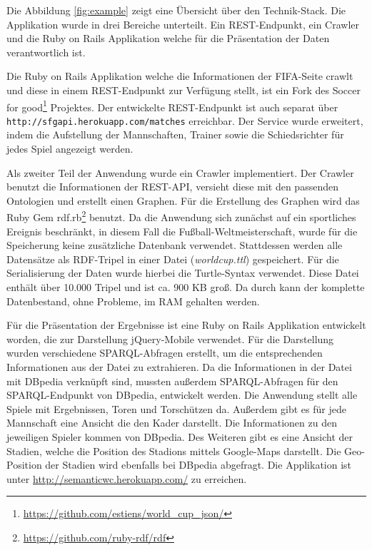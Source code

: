 \documentclass[runningheads,a4paper]{llncs}
\begin{document}
Die Abbildung \ref{fig:example} zeigt eine Übersicht über den Technik-Stack. Die Applikation wurde in drei Bereiche unterteilt. Ein REST-Endpunkt, ein Crawler und die Ruby on Rails Applikation welche für die Präsentation der Daten verantwortlich ist.

Die Ruby on Rails Applikation welche die Informationen der FIFA-Seite crawlt und diese in einem REST-Endpunkt zur Verfügung stellt, ist ein Fork des Soccer for good\footnote{\url{https://github.com/estiens/world_cup_json/}} Projektes. Der entwickelte REST-Endpunkt ist auch separat über \texttt{http://sfgapi.herokuapp.com/matches} erreichbar. Der Service wurde erweitert, indem die Aufstellung der Mannschaften, Trainer sowie die Schiedsrichter für jedes Spiel angezeigt werden. 

Als zweiter Teil der Anwendung wurde ein Crawler implementiert. Der Crawler benutzt die Informationen der REST-API, versieht diese mit den passenden Ontologien und erstellt einen Graphen. Für die Erstellung des Graphen wird das Ruby Gem rdf.rb\footnote{\url{https://github.com/ruby-rdf/rdf}} benutzt. Da die Anwendung sich zunächst auf ein sportliches Ereignis beschränkt, in diesem Fall die Fußball-Weltmeisterschaft, wurde für die Speicherung keine zusätzliche Datenbank verwendet. Stattdessen werden alle Datensätze als RDF-Tripel in einer Datei (\textit{worldcup.ttl}) gespeichert. Für die Serialisierung der Daten wurde hierbei die Turtle-Syntax verwendet. Diese Datei enthält über 10.000 Tripel und ist ca. 900 KB groß. Da durch kann der komplette Datenbestand, ohne Probleme, im RAM gehalten werden.

Für die Präsentation der Ergebnisse ist eine Ruby on Rails Applikation entwickelt worden, die zur Darstellung jQuery-Mobile verwendet. Für die Darstellung wurden verschiedene SPARQL-Abfragen erstellt, um die entsprechenden Informationen aus der Datei zu extrahieren. Da die Informationen in der Datei mit DBpedia verknüpft sind, mussten außerdem SPARQL-Abfragen für den SPARQL-Endpunkt von DBpedia, entwickelt werden. Die Anwendung stellt alle Spiele mit Ergebnissen, Toren und Torschützen da. Außerdem gibt es für jede Mannschaft eine Ansicht die den Kader darstellt. Die Informationen zu den jeweiligen Spieler kommen von DBpedia. Des Weiteren gibt es eine Ansicht der Stadien, welche die Position des Stadions mittels Google-Maps darstellt. Die Geo-Position der Stadien wird ebenfalls bei DBpedia abgefragt. Die Applikation ist unter \url{http://semanticwc.herokuapp.com/} zu erreichen.
\end{document}
